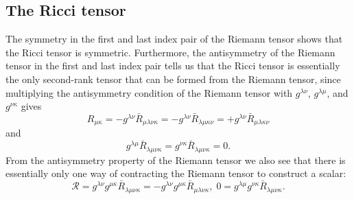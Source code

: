 \subsection{The Ricci tensor}
The symmetry in the first and last index pair of the Riemann tensor shows that the Ricci tensor is symmetric. Furthermore, the antisymmetry of the Riemann tensor in the first and last index pair tells us that the Ricci tensor is essentially the only second-rank tensor that can be formed from the Riemann tensor, since
multiplying the antisymmetry condition of the Riemann tensor with $g^{\lambda \nu}$, $g^{\lambda \mu}$, and $g^{\nu \kappa}$ gives
\begin{equation}
	R_{\mu \kappa} = -g^{\lambda \nu} \bar{R}_{\mu \lambda \nu \kappa} = - g^{\lambda \nu} \bar{R}_{\lambda \mu \kappa \nu} = + g^{\lambda \nu} \bar{R}_{\mu\lambda \kappa \nu}
\end{equation}
and 
\begin{equation}
	g^{\lambda \mu} \bar{R}_{\lambda \mu \nu \kappa} = g^{\nu \kappa} \bar{R}_{\lambda \mu \nu \kappa}=0.
\end{equation}
From the antisymmetry property of the Riemann tensor we also see that there is essentially only one way of contracting the Riemann tensor to construct a scalar:
\begin{equation}
	\mathcal{R}=g^{\lambda \nu} g^{\mu \kappa} \bar{R}_{\lambda \mu \nu \kappa} = - g^{\lambda \nu} g^{\mu \kappa} \bar{R}_{\mu \lambda \nu \kappa}, \; 0 = g^{\lambda \mu} g^{\nu \kappa} \bar{R}_{\lambda \mu \nu \kappa}.
\end{equation}
